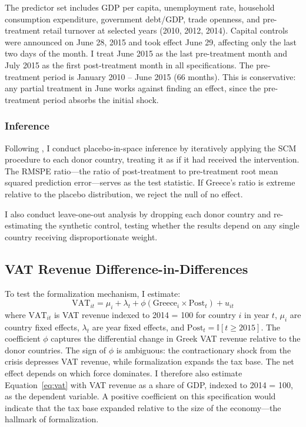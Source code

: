 \documentclass[12pt]{article}
\newcommand{\ind}{\mathbb{I}}
\begin{document}
The predictor set includes GDP per capita, unemployment rate, household consumption expenditure, government debt/GDP, trade openness, and pre-treatment retail turnover at selected years (2010, 2012, 2014). Capital controls were announced on June 28, 2015 and took effect June 29, affecting only the last two days of the month. I treat June 2015 as the last pre-treatment month and July 2015 as the first post-treatment month in all specifications. The pre-treatment period is January 2010 -- June 2015 (66 months). This is conservative: any partial treatment in June works against finding an effect, since the pre-treatment period absorbs the initial shock.

\subsubsection{Inference}

Following \citet{abadie2010synthetic}, I conduct placebo-in-space inference by iteratively applying the SCM procedure to each donor country, treating it as if it had received the intervention. The RMSPE ratio---the ratio of post-treatment to pre-treatment root mean squared prediction error---serves as the test statistic. If Greece's ratio is extreme relative to the placebo distribution, we reject the null of no effect.

I also conduct leave-one-out analysis by dropping each donor country and re-estimating the synthetic control, testing whether the results depend on any single country receiving disproportionate weight.

\subsection{VAT Revenue Difference-in-Differences}

To test the formalization mechanism, I estimate:
\begin{equation}
    \text{VAT}_{it} = \mu_i + \lambda_t + \phi \left( \text{Greece}_i \times \text{Post}_t \right) + u_{it}
    \label{eq:vat}
\end{equation}
where $\text{VAT}_{it}$ is VAT revenue indexed to 2014 = 100 for country $i$ in year $t$, $\mu_i$ are country fixed effects, $\lambda_t$ are year fixed effects, and $\text{Post}_t = \ind[t \geq 2015]$. The coefficient $\phi$ captures the differential change in Greek VAT revenue relative to the donor countries. The sign of $\phi$ is ambiguous: the contractionary shock from the crisis depresses VAT revenue, while formalization expands the tax base. The net effect depends on which force dominates. I therefore also estimate Equation~\ref{eq:vat} with VAT revenue as a share of GDP, indexed to 2014 = 100, as the dependent variable. A positive coefficient on this specification would indicate that the tax base expanded relative to the size of the economy---the hallmark of formalization.
\end{document}
